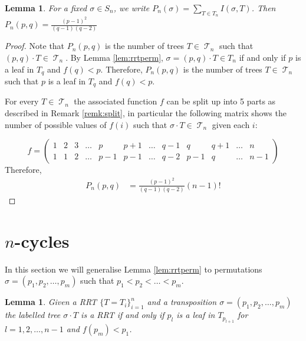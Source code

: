 \documentclass[10pt]{amsart} %
\newtheorem{lem}[thm]{Lemma}
\theoremstyle{definition}
\DeclareMathOperator{\T}{\mathcal{T}}
\begin{document}
\begin{lem}\label{lem:pn}
 For a fixed $ \sigma \in S_n$, we write $P_n(\sigma) = \sum_{T \in T_n}I(\sigma,T)$.  Then $P_n(p,q) = \frac{(p-1)^{2}}{(q-1)(q-2)}$ 
\end{lem}
\begin{proof}
Note that $P_n(p,q)$  is the number of trees $T \in \T_n$ such that $(p,q) \cdot T \in \T_n$. By Lemma \ref{lem:rrtperm},  $\sigma  = (p,q) \cdot T \in T_n$ if and only if $p$ is a leaf in $T_q$ and $f(q)< p$.  Therefore,  $P_n(p,q)$ is the number of trees $T \in \T_n$ such that $p$ is a leaf in $T_q$ and $f(q)< p$.  

For every $T \in \T_n$ the associated function $f$ can be split up into 5 parts as described in Remark \ref{remk:split}, in particular the following matrix shows the number of possible values of $f(i)$ such that $\sigma \cdot T \in \T_n$ given each $i$:

 \[ f = \left(\begin{array}{cccc|c|ccc|c|ccc}
     1  & 2  & 3 & \dots & p   & p+1 & \dots & q-1 & q    & q+1    & \dots & n \\
     1  & 1  & 2 & \dots & p-1 & p-1 & \dots & q-2 & p-1  & q      & \dots & n-1
    \end{array} \right)
\]
Therefore,  
\begin{align*}
 P_n(p,q) &= %
 \frac{(p-1)^2}{(q-1)(q-2)}(n-1)!
\end{align*}
\end{proof}



\section{$n$-cycles}
In this section we will generalise  Lemma \ref{lem:rrtperm} to permutations $\sigma = (p_1,p_2,\dots,p_m)$ such that $p_1 < p_2 < \dots < p_m $.  
\begin{lem}\label{lem:mcycles}
Given a RRT $\{T = T_{i}\}_{i=1}^{n}$ and a transposition $\sigma  = (p_1,p_2,\dots,p_m)$ the labelled tree $\sigma  \cdot T$ is a RRT if and only if  $p_l$ is a leaf in $T_{p_{l+1}}$ for $l = 1,2,\dots,n-1$ and $f(p_m) < p_1$.     
\end{lem}
\end{document}
